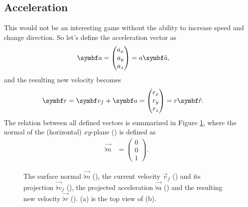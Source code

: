 
\subsection{Acceleration}
\label{sec:acceleration}
This would not be an interesting game without the ability to increase speed and change direction. So let's define the acceleration vector as
\begin{align*}
\vec{a} &=
\begin{pmatrix}
a_x \\ a_y \\ a_z
\end{pmatrix} = a \uvec{a},
\end{align*}
and the resulting new velocity becomes
\begin{align*}
\vec{r} &= \vec{v}_{f} + \vec{a} =
\begin{pmatrix}
r_x \\ r_y \\ r_z
\end{pmatrix} = r \uvec{r}.
\end{align*}
The relation between all defined vectors is summarized in Figure \ref{fig:delta_phi}, where the normal of the (horizontal) $xy$-plane (\greenarea) is defined as
\begin{align*}
\vec{\flat{n}} &=
\begin{pmatrix}
0\\0\\1
\end{pmatrix}.
\end{align*}
\begin{figure}[H]
	\centering
	\begin{subfigure}[t]{.5\textwidth}
		\centering
		\setlength\figureheight{5.5cm}
		\setlength\figurewidth{5.5cm}
		\caption{}
	\end{subfigure}%
	\begin{subfigure}[t]{.5\textwidth}
		\centering
		\setlength\figureheight{9.5cm}
		\setlength\figurewidth{9.5cm}
		\caption{}
	\end{subfigure}%
	\caption{The surface normal $\vec{\flat{n}}$ (\greenarrow), the current velocity $\vec{v}_f$ (\yellowdenselydottedarrow) and its projection $\vec{\flat{v}}_f$ (\yellowarrow), the projected acceleration $\vec{\flat{a}}$ (\orangearrow) and the resulting new velocity $\vec{\flat{r}}$ (\bluearrow). (a) is the top view of (b).}
	\label{fig:delta_phi}
\end{figure}

